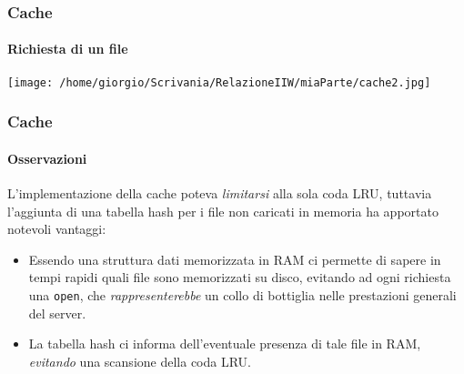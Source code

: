 \documentclass{beamer}
\begin{document}
\begin{frame}
\frametitle{Cache}
\framesubtitle{Richiesta di un file}

\begin{center}
\texttt{[image: /home/giorgio/Scrivania/RelazioneIIW/miaParte/cache2.jpg]}
\end{center}


\end{frame}


\begin{frame}
\frametitle{Cache}
\framesubtitle{Osservazioni}


L’implementazione della cache poteva \textit{limitarsi} alla sola coda LRU, tuttavia
l’aggiunta di una tabella hash per i file non caricati in memoria ha apportato
notevoli vantaggi:
\begin{itemize}
\item Essendo una struttura dati memorizzata in RAM ci permette di sapere in tempi
rapidi quali file sono memorizzati su disco, evitando ad ogni richiesta una
\texttt{open}, che \textit{rappresenterebbe} un collo di bottiglia nelle prestazioni generali del server.
\item La tabella hash ci informa dell’eventuale presenza di tale file in RAM, \textit{evitando}
una scansione della coda LRU.
\end{itemize}
\end{frame}
\end{document}
